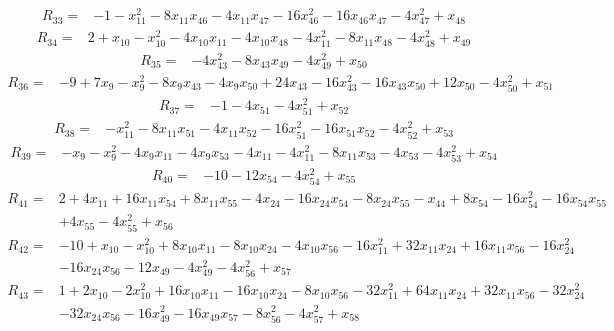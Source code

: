\begin{align*}
 R_{33}={}&-1 -x_{11}^{2} -8x_{11}x_{46} -4x_{11}x_{47} -16x_{46}^{2} -16x_{46}x_{47} -4x_{47}^{2} +x_{48}
\end{align*}
\begin{align*}
 R_{34}={}&2 +x_{10} -x_{10}^{2} -4x_{10}x_{11} -4x_{10}x_{48} -4x_{11}^{2} -8x_{11}x_{48} -4x_{48}^{2} +x_{49}
\end{align*}
\begin{align*}
 R_{35}={}&-4x_{43}^{2} -8x_{43}x_{49} -4x_{49}^{2} +x_{50}
\end{align*}
\begin{align*}
 R_{36}={}&-9 +7x_{9} -x_{9}^{2} -8x_{9}x_{43} -4x_{9}x_{50} +24x_{43} -16x_{43}^{2} -16x_{43}x_{50} +12x_{50} -4x_{50}^{2} +x_{51}
\end{align*}
\begin{align*}
 R_{37}={}&-1 -4x_{51} -4x_{51}^{2} +x_{52}
\end{align*}
\begin{align*}
 R_{38}={}&-x_{11}^{2} -8x_{11}x_{51} -4x_{11}x_{52} -16x_{51}^{2} -16x_{51}x_{52} -4x_{52}^{2} +x_{53}
\end{align*}
\begin{align*}
 R_{39}={}&-x_{9} -x_{9}^{2} -4x_{9}x_{11} -4x_{9}x_{53} -4x_{11} -4x_{11}^{2} -8x_{11}x_{53} -4x_{53} -4x_{53}^{2} +x_{54}
\end{align*}
\begin{align*}
 R_{40}={}&-10 -12x_{54} -4x_{54}^{2} +x_{55}
\end{align*}
\begin{align*}
 R_{41}={}&2 +4x_{11} +16x_{11}x_{54} +8x_{11}x_{55} -4x_{24} -16x_{24}x_{54} -8x_{24}x_{55} -x_{44} +8x_{54} -16x_{54}^{2} -16x_{54}x_{55}\\
 &+4x_{55} -4x_{55}^{2} +x_{56}
\end{align*}
\begin{align*}
 R_{42}={}&-10 +x_{10} -x_{10}^{2} +8x_{10}x_{11} -8x_{10}x_{24} -4x_{10}x_{56} -16x_{11}^{2} +32x_{11}x_{24} +16x_{11}x_{56} -16x_{24}^{2}\\
 &-16x_{24}x_{56} -12x_{49} -4x_{49}^{2} -4x_{56}^{2} +x_{57}
\end{align*}
\begin{align*}
 R_{43}={}&1 +2x_{10} -2x_{10}^{2} +16x_{10}x_{11} -16x_{10}x_{24} -8x_{10}x_{56} -32x_{11}^{2} +64x_{11}x_{24} +32x_{11}x_{56} -32x_{24}^{2}\\
 &-32x_{24}x_{56} -16x_{49}^{2} -16x_{49}x_{57} -8x_{56}^{2} -4x_{57}^{2} +x_{58}
\end{align*}

